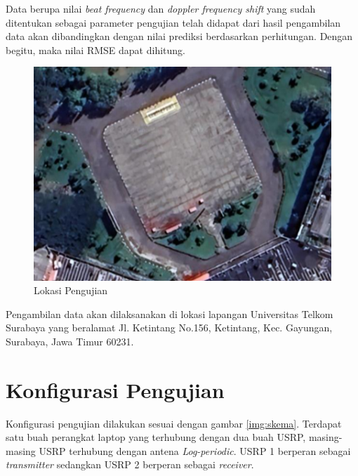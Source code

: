 Data berupa nilai \textit{beat frequency} dan \textit{doppler frequency shift} yang sudah ditentukan sebagai parameter pengujian telah didapat dari hasil pengambilan data akan dibandingkan dengan nilai prediksi berdasarkan perhitungan. Dengan begitu, maka nilai RMSE dapat dihitung.

\begin{figure}
	\begin{center}
		\includegraphics[scale=0.35]{pics/bab3/petaPengujian.png}
		\caption{Lokasi Pengujian}
		\label{img:petaUji}
	\end{center}
\end{figure}

Pengambilan data akan dilaksanakan di lokasi lapangan Universitas Telkom Surabaya yang beralamat Jl. Ketintang No.156, Ketintang, Kec. Gayungan, Surabaya, Jawa Timur 60231.

\section{Konfigurasi Pengujian}
Konfigurasi pengujian dilakukan sesuai dengan gambar \ref{img:skema}. Terdapat satu buah perangkat laptop yang terhubung dengan dua buah USRP, masing-masing USRP terhubung dengan antena \textit{Log-periodic}. USRP 1 berperan sebagai \textit{transmitter} sedangkan USRP 2 berperan sebagai \textit{receiver}.

